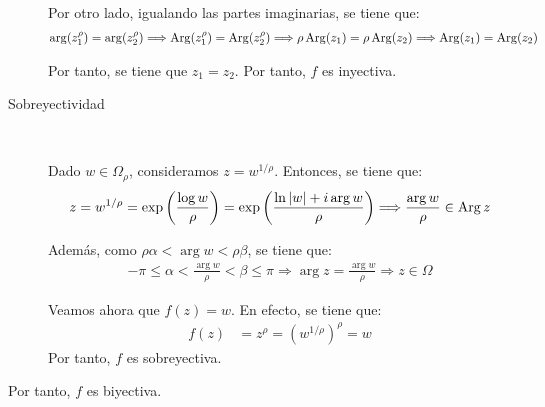 \begin{ejercicio}
\begin{description}
        Por otro lado, igualando las partes imaginarias, se tiene que:
        \begin{align*}
            \arg(z_1^\rho) &= \arg(z_2^\rho) \Longrightarrow \operatorname{Arg}(z_1^\rho) = \operatorname{Arg}(z_2^\rho) \Longrightarrow \rho\operatorname{Arg}(z_1) = \rho\operatorname{Arg}(z_2)\Longrightarrow \operatorname{Arg}(z_1) = \operatorname{Arg}(z_2)
        \end{align*}

        Por tanto, se tiene que $z_1=z_2$. Por tanto, $f$ es inyectiva.

        \item[Sobreyectividad]~
        
        Dado $w\in \Omega_\rho$, consideramos $z=w^{1/\rho}$. Entonces, se tiene que:
        \begin{equation*}
            z=w^{1/\rho} = \exp\left(\frac{\log w}{\rho}\right) = \exp\left(\frac{\ln |w| + i\arg w}{\rho}\right)\Longrightarrow
            \dfrac{\arg w}{\rho}\in \operatorname{Arg} z
        \end{equation*}

        Además, como $\rho\alpha < \arg w < \rho\beta$, se tiene que:
        \begin{align*}
            -\pi\leq \alpha < \frac{\arg w}{\rho} < \beta\leq \pi
            \Longrightarrow \arg z = \frac{\arg w}{\rho}\Longrightarrow z\in \Omega
        \end{align*}

        Veamos ahora que $f(z)=w$. En efecto, se tiene que:
        \begin{align*}
            f(z) &= z^\rho = \left(w^{1/\rho}\right)^\rho = w
        \end{align*}
        Por tanto, $f$ es sobreyectiva.
    \end{description}

    Por tanto, $f$ es biyectiva.
\end{ejercicio}

